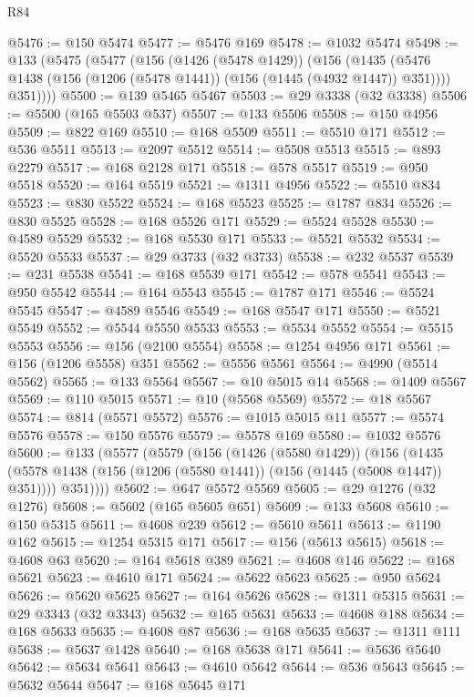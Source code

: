 \begin{lexlean}{R84}
\begin{coremodule}
@5476 := @150 @5474
@5477 := @5476 @169
@5478 := @1032 @5474
@5498 := @133
    (@5475
      (@5477
        (@156
          (@1426 (@5478 @1429))
          (@156
            (@1435 (@5476 @1438 (@156 (@1206 (@5478 @1441)) (@156 (@1445 (@4932 @1447)) @351))))
            @351))))
@5500 := @139 @5465 @5467
@5503 := @29 @3338 (@32 @3338)
@5506 := @5500 (@165 @5503 @537)
@5507 := @133 @5506
@5508 := @150 @4956
@5509 := @822 @169
@5510 := @168 @5509
@5511 := @5510 @171
@5512 := @536 @5511
@5513 := @2097 @5512
@5514 := @5508 @5513
@5515 := @893 @2279
@5517 := @168 @2128 @171
@5518 := @578 @5517
@5519 := @950 @5518
@5520 := @164 @5519
@5521 := @1311 @4956
@5522 := @5510 @834
@5523 := @830 @5522
@5524 := @168 @5523
@5525 := @1787 @834
@5526 := @830 @5525
@5528 := @168 @5526 @171
@5529 := @5524 @5528
@5530 := @4589 @5529
@5532 := @168 @5530 @171
@5533 := @5521 @5532
@5534 := @5520 @5533
@5537 := @29 @3733 (@32 @3733)
@5538 := @232 @5537
@5539 := @231 @5538
@5541 := @168 @5539 @171
@5542 := @578 @5541
@5543 := @950 @5542
@5544 := @164 @5543
@5545 := @1787 @171
@5546 := @5524 @5545
@5547 := @4589 @5546
@5549 := @168 @5547 @171
@5550 := @5521 @5549
@5552 := @5544 @5550 @5533
@5553 := @5534 @5552
@5554 := @5515 @5553
@5556 := @156 (@2100 @5554)
@5558 := @1254 @4956 @171
@5561 := @156 (@1206 @5558) @351
@5562 := @5556 @5561
@5564 := @4990 (@5514 @5562)
@5565 := @133 @5564
@5567 := @10 @5015 @14
@5568 := @1409 @5567
@5569 := @110 @5015
@5571 := @10 (@5568 @5569)
@5572 := @18 @5567
@5574 := @814 (@5571 @5572)
@5576 := @1015 @5015 @11
@5577 := @5574 @5576
@5578 := @150 @5576
@5579 := @5578 @169
@5580 := @1032 @5576
@5600 := @133
    (@5577
      (@5579
        (@156
          (@1426 (@5580 @1429))
          (@156
            (@1435 (@5578 @1438 (@156 (@1206 (@5580 @1441)) (@156 (@1445 (@5008 @1447)) @351))))
            @351))))
@5602 := @647 @5572 @5569
@5605 := @29 @1276 (@32 @1276)
@5608 := @5602 (@165 @5605 @651)
@5609 := @133 @5608
@5610 := @150 @5315
@5611 := @4608 @239
@5612 := @5610 @5611
@5613 := @1190 @162
@5615 := @1254 @5315 @171
@5617 := @156 (@5613 @5615)
@5618 := @4608 @63
@5620 := @164 @5618 @389
@5621 := @4608 @146
@5622 := @168 @5621
@5623 := @4610 @171
@5624 := @5622 @5623
@5625 := @950 @5624
@5626 := @5620 @5625
@5627 := @164 @5626
@5628 := @1311 @5315
@5631 := @29 @3343 (@32 @3343)
@5632 := @165 @5631
@5633 := @4608 @188
@5634 := @168 @5633
@5635 := @4608 @87
@5636 := @168 @5635
@5637 := @1311 @111
@5638 := @5637 @1428
@5640 := @168 @5638 @171
@5641 := @5636 @5640
@5642 := @5634 @5641
@5643 := @4610 @5642
@5644 := @536 @5643
@5645 := @5632 @5644
@5647 := @168 @5645 @171

\end{coremodule}
\end{lexlean}
